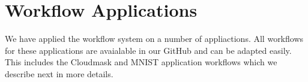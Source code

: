 
\section{Workflow Applications}

We have applied the workflow system on a number of appliactions. All workflows for these applications are avaialable in our GitHub and can be adapted easily.
This includes the Cloudmask and MNIST application workflows which we describe next in more details.


